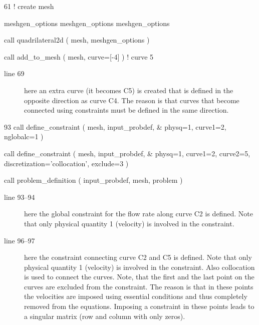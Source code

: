 \begin{listing}{61}
! create mesh
                                                                                
  meshgen_options%
  meshgen_options%
  meshgen_options%
                                                                                
  call quadrilateral2d ( mesh, meshgen_options )
                                                                                
  call add_to_mesh ( mesh, curve=[-4] )     ! curve 5
                                                                                
\end{listing}
\begin{description}
   \item[line 69] here an extra curve (it becomes C5) is created that is
defined in the opposite direction as curve C4. The reason is that curves that
become connected using constraints must be defined in the same direction.
\end{description}
\begin{listing}{93}
  call define_constraint ( mesh, input_probdef, &
    physq=1, curve1=2, nglobalc=1 )
                                                                                
  call define_constraint ( mesh, input_probdef, &
    physq=1, curve1=2, curve2=5, discretization='collocation', exclude=3 )
                                                                                
  call problem_definition ( input_probdef, mesh, problem )
                                                                                
\end{listing}
\begin{description}
   \item[line 93--94] here the global constraint for the flow rate along curve
     C2 is defined. Note that only physical quantity 1 (velocity) is involved
     in the constraint.
   \item[line 96--97] here the constraint connecting curve C2 and C5 
     is defined. Note that only physical quantity 1 (velocity) is involved
     in the constraint. Also collocation is used to connect the curves. Note,
     that the first and the last point on the curves are excluded from the
     constraint. The reason is that in these points the velocities are imposed
     using essential conditions and thus completely removed from the equations.
     Imposing a constraint in these points leads to a singular matrix (row and
     column with only zeros).
\end{description}
